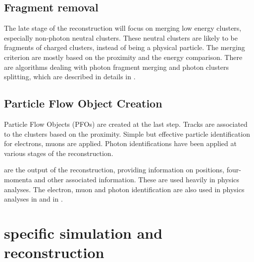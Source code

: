 \subsection{Fragment removal}
\label{sec:pandoraFragmentRemoval}

The late stage of the reconstruction will focus on merging low energy clusters, especially non-photon neutral clusters. These neutral clusters are likely to be fragments of charged clusters, instead of being a physical particle. The merging criterion are mostly based on the proximity and the energy comparison. There are algorithms dealing with photon fragment merging and photon clusters splitting, which are described in details in .

\subsection{Particle Flow Object Creation}
\label{sec:pandoraPFOcreation}

Particle Flow Objects (PFOs) are created at the last step. Tracks are associated to the clusters based on the proximity. Simple but effective particle identification for electrons, muons are applied. Photon identifications have been applied at various stages of the reconstruction.

\PFOs are the output of the \pandora reconstruction, providing information on positions, four-momenta and other associated information. These \PFOs are  used heavily in physics analyses. The electron, muon and photon identification are  also used in physics analyses in  and in .


\section{\CLIC specific simulation and reconstruction}


